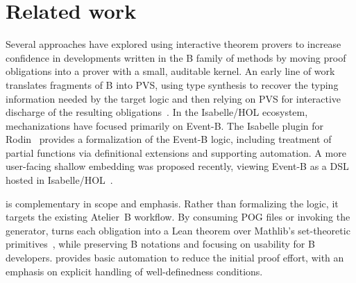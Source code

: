 \section{Related work}
\label{sec:related}

Several approaches have explored using interactive theorem provers to increase confidence in developments written in the B family of methods by moving proof obligations into a prover with a small, auditable kernel.
An early line of work translates fragments of B into PVS, using type synthesis to recover the typing information needed by the target logic and then relying on PVS for interactive discharge of the resulting obligations~\cite{Bodeveix2002BtoPVS}.
In the Isabelle/HOL ecosystem, mechanizations have focused primarily on Event-B.
The Isabelle plugin for Rodin~\cite{Schmalz2012RodinIsabelle} provides a formalization of the Event-B logic, including treatment of partial functions via definitional extensions and supporting automation.
A more user-facing shallow embedding was proposed recently, viewing Event-B as a DSL hosted in Isabelle/HOL~\cite{Wolff2024EB_Isabelle}.

\barrel is complementary in scope and emphasis.
Rather than formalizing the logic, it targets the existing Atelier~B workflow.
By consuming POG files or invoking the generator, \barrel turns each obligation into a Lean theorem over Mathlib’s set-theoretic primitives~\cite{mathlib4}, while preserving B notations and focusing on usability for B developers.
\barrel provides basic automation to reduce the initial proof effort, with an emphasis on explicit handling of well-definedness conditions.
